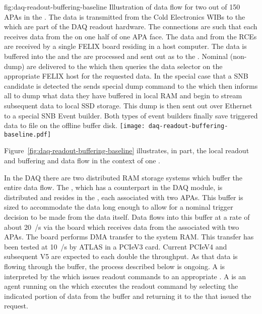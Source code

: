 \begin{dunefigure}{fig:daq-readout-buffering-baseline}
  {Illustration of data flow for two out of 150 APAs in the 
    . 
    The data is transmitted from the Cold Electronics WIBs to the
     which are part of the  DAQ 
    readout hardware. 
    The connections are such that each  receives data from
    the  on one half of one APA face.
    The data and  from the RCEs are received by
    a single FELIX board residing in a host computer. 
    The data is buffered into the  and the
     are processed and sent out as
     to the .
    Nominal (non-dump)  are delivered to the
     which then queries the data selector on the appropriate
    FELIX host for the requested data.
    In the special case that a SNB candidate is detected the
     sends special dump command to the  which
    then informs all  to dump what data they have buffered
    in local RAM and begin to stream subsequent data to local SSD
    storage.
    This dump is then sent out over Ethernet to a special SNB Event
    builder. 
    Both types of event builders finally save triggered data to file
    on the offline buffer disk.
    }  
  \texttt{[image: daq-readout-buffering-baseline.pdf]}%
\end{dunefigure}


Figure~\ref{fig:daq-readout-buffering-baseline} illustrates, in part,
the local readout and buffering and data flow in the context of one
.  

In the   DAQ there are two distributed RAM
storage systems which buffer the entire data flow. 
The , which has a counterpart in the  DAQ
module, is distributed and resides in the , each
associated with two APAs. 
This buffer is sized to accommodate the data long enough to allow for
a nominal trigger decision to be made from the data itself.
Data flows into this buffer at a rate of about \SI{20}{\GB/\s} via the
 board which receives data from the 
associated with two APAs. 
The  board performs DMA transfer to the system RAM. 
This transfer has been tested at \SI{10}{\GB/\s} by ATLAS in a PCIeV3
card. 
Current PCIeV4 and subsequent V5 are expected to each double the
throughput.
As that data is flowing through the buffer, the 
process described below is ongoing.
A  is interpreted by the  which issues
readout commands to an appropriate . 
A  is an agent running on the  which
executes the readout command by selecting the indicated portion of
data from the buffer and returning it to the  that issued
the request.

